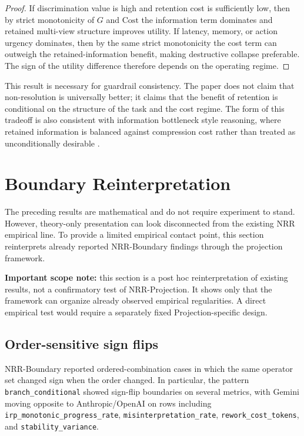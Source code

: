 \documentclass[11pt,a4paper]{article}
\begin{document}
\begin{proof}
If discrimination value is high and retention cost is sufficiently low, then by strict monotonicity of $G$ and $\text{Cost}$ the information term dominates and retained multi-view structure improves utility. If latency, memory, or action urgency dominates, then by the same strict monotonicity the cost term can outweigh the retained-information benefit, making destructive collapse preferable. The sign of the utility difference therefore depends on the operating regime.
\end{proof}

This result is necessary for guardrail consistency. The paper does not claim that non-resolution is universally better; it claims that the benefit of retention is conditional on the structure of the task and the cost regime. The form of this tradeoff is also consistent with information bottleneck style reasoning, where retained information is balanced against compression cost rather than treated as unconditionally desirable \cite{tishby1999information}.

\section{Boundary Reinterpretation}
\label{sec:boundary}

The preceding results are mathematical and do not require experiment to stand. However, theory-only presentation can look disconnected from the existing NRR empirical line. To provide a limited empirical contact point, this section reinterprets already reported NRR-Boundary findings through the projection framework.

\textbf{Important scope note:} this section is a post hoc reinterpretation of existing results, not a confirmatory test of NRR-Projection. It shows only that the framework can organize already observed empirical regularities. A direct empirical test would require a separately fixed Projection-specific design.

\subsection{Order-sensitive sign flips}

NRR-Boundary reported ordered-combination cases in which the same operator set changed sign when the order changed. In particular, the pattern \texttt{branch\_conditional} showed sign-flip boundaries on several metrics, with Gemini moving opposite to Anthropic/OpenAI on rows including \texttt{irp\_monotonic\_progress\_rate}, \texttt{misinterpretation\_rate}, \texttt{rework\_cost\_tokens}, and \texttt{stability\_variance}.
\end{document}

